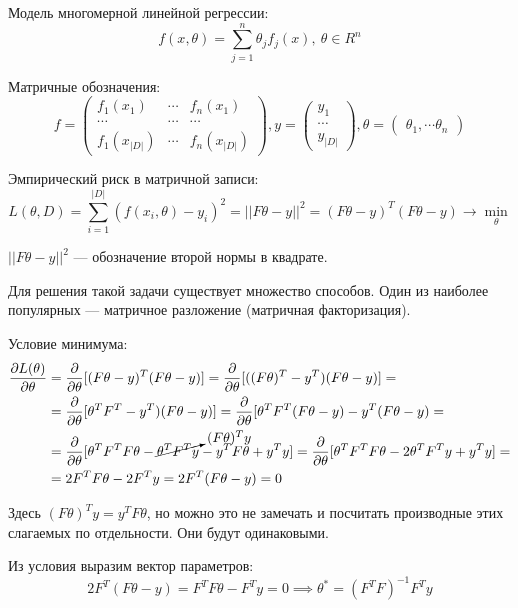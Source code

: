 Модель многомерной линейной регрессии:
\[
    f(x, \theta) = \sum_{j=1}^n \theta_j f_j(x),\ \theta \in R^n
\]

Матричные обозначения:
\[
    f =
    \begin{pmatrix}
        f_1(x_1) & \cdots & f_n(x_1)\\
        \cdots & \cdots & \cdots\\
        f_1(x_{|D|}) & \cdots & f_n(x_{|D|})
    \end{pmatrix},
    y =
    \begin{pmatrix}
        y_1\\
        \cdots\\
        y_{|D|}
    \end{pmatrix},
    \theta =
    \begin{pmatrix}
        \theta_1,
        \cdots
        \theta_n
    \end{pmatrix}
\]

Эмпирический риск в матричной записи:
\[
    L(\theta, D) = \sum^{|D|}_{i=1}(f(x_i, \theta) - y_i)^2 = ||F\theta - y||^2
    = (F\theta - y)^T(F\theta - y) \to \min_\theta
\]

$||F\theta - y||^2$ --- обозначение второй нормы в квадрате.

Для решения такой задачи существует множество способов. Один из наиболее
популярных --- матричное разложение (матричная факторизация).

Условие минимума:
\begin{align*}
    \frac{\partial L(\theta)}{\partial \theta}
    &=
    \frac{\partial}{\partial \theta}[(F\theta - y)^T(F\theta - y)] =
    \frac{\partial}{\partial \theta}[((F\theta)^T - y^T)(F\theta - y)] =
    \\
   &=
   \frac{\partial}{\partial\theta}[\theta^T F^T - y^T)(F\theta - y)] =
   \frac{\partial}{\partial\theta}[\theta^T F^T (F \theta - y) - y^T(F\theta -
   y) =
   \\
   &= \frac{\partial}{\partial\theta}[\theta^T F^T F \theta -
   \cancelto{(F\theta)^Ty}{\theta^T F^T y} - y^T F \theta + y^Ty] = 
  \frac{\partial}{\partial\theta}[ \theta^T F^T F \theta - 2\theta^T F^T y +
  y^T y] =
  \\
   &= 2F^T F \theta - 2F^Ty = 2F^T(F\theta - y) = 0
\end{align*}

Здесь $(F\theta)^T y = y^TF\theta$, но можно это не замечать и посчитать
производные этих слагаемых по отдельности. Они будут одинаковыми.

Из условия выразим вектор параметров:
\[
    2F^T(F\theta - y) = F^T F \theta - F^T y = 0 \implies \theta^* = (F^T F)^{-1}
    F^T y
\]

